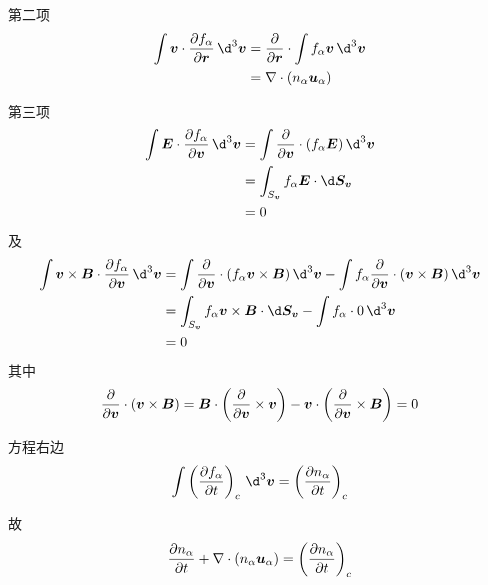 第二项
\begin{equation}\begin{aligned}
    \int \vector{v} \cdot \pDeriv{f_\alpha}{\vector{r}} \, \d^3 \vector{v}
    &= \pDeriv{}{\vector{r}} \cdot \int f_\alpha \vector{v} \, \d^3 \vector{v} \\
    &= \dive{(n_\alpha \vector{u}_\alpha)}
\end{aligned}\end{equation}

第三项
\begin{equation}\begin{aligned}
    \int \vector{E} \cdot \pDeriv{f_\alpha}{\vector{v}} \, \d^3 \vector{v}
    &= \int \pDeriv{}{\vector{v}} \cdot (f_\alpha \vector{E}) \, \d^3 \vector{v} \\
    &= \int_{S_{\vector{v}}} f_\alpha \vector{E} \cdot \d \vector{S}_{\vector{v}} \\
    &= 0
\end{aligned}\end{equation}
及
\begin{equation}\begin{aligned}
    \int \vector{v} \times \vector{B} \cdot \pDeriv{f_\alpha}{\vector{v}} \, \d^3 \vector{v}
    &= \int \pDeriv{}{\vector{v}} \cdot (f_\alpha \vector{v} \times \vector{B}) \, \d^3 \vector{v}
    - \int f_\alpha \pDeriv{}{\vector{v}} \cdot (\vector{v} \times \vector{B}) \, \d^3 \vector{v} \\
    &= \int_{S_{\vector{v}}} f_\alpha \vector{v} \times \vector{B} \cdot \d \vector{S}_{\vector{v}}
    - \int f_\alpha \cdot 0 \, \d^3 \vector{v} \\
    &= 0
\end{aligned}\end{equation}
其中
\begin{equation}
    \frac{\partial {}}{\partial {\bm{v}}} \cdot (\bm{v} \times \bm{B})
    = \bm{B} \cdot \left( \frac{\partial {}}{\partial {\bm{v}}} \times \bm{v} \right)
    - \bm{v} \cdot \left( \frac{\partial {}}{\partial {\bm{v}}} \times \bm{B} \right)
    = 0
\end{equation}

方程右边
\begin{equation}
    \int \left( \pDeriv{f_\alpha}{t} \right)_c \, \d^3 \vector{v} = \left( \pDeriv{n_\alpha}{t} \right)_c
\end{equation}

故
\begin{equation}
    \frac{\partial {n_\alpha}}{\partial {t}} + \nabla \cdot {(n_\alpha \bm{u}_\alpha)} = \left( \frac{\partial {n_\alpha}}{\partial {t}} \right)_c
\end{equation}


